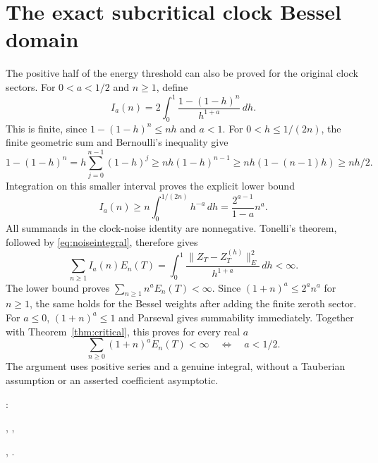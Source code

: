 \documentclass[11pt]{article}
\begin{document}
\section{The exact subcritical clock Bessel domain}
The positive half of the energy threshold can also be proved for the
original clock sectors. For $0<a<1/2$ and $n\geq1$, define
\[
 I_a(n)=2\int_0^1\frac{1-(1-h)^n}{h^{1+a}}\,dh.
\]
This is finite, since $1-(1-h)^n\leq nh$ and $a<1$.
For $0<h\leq1/(2n)$, the finite geometric sum and Bernoulli's inequality
give
\[
 1-(1-h)^n=h\sum_{j=0}^{n-1}(1-h)^j
 \geq nh(1-h)^{n-1}\geq nh(1-(n-1)h)\geq nh/2.
\]
Integration on this smaller interval proves the explicit lower bound
\[
 I_a(n)\geq n\int_0^{1/(2n)}h^{-a}\,dh
       =\frac{2^{a-1}}{1-a}n^a.
\]
All summands in the clock-noise identity are nonnegative. Tonelli's
theorem, followed by \eqref{eq:noiseintegral}, therefore gives
\[
 \sum_{n\geq1}I_a(n)E_n(T)
 =\int_0^1\frac{\|Z_T-Z_T^{(h)}\|_E^2}{h^{1+a}}\,dh<\infty.
\]
The lower bound proves $\sum_{n\geq1}n^aE_n(T)<\infty$.
Since $(1+n)^a\leq2^a n^a$ for $n\geq1$, the same holds for the
Bessel weights after adding the finite zeroth sector. For $a\leq0$,
$(1+n)^a\leq1$ and Parseval gives summability immediately.
Together with Theorem~\ref{thm:critical}, this proves for every real $a$
\begin{equation}\label{eq:sharpbesselsum}
 \sum_{n\geq0}(1+n)^aE_n(T)<\infty
                    \quad\Longleftrightarrow\quad a<1/2.
\end{equation}
The argument uses positive series and a genuine integral, without a
Tauberian assumption or an asserted coefficient asymptotic.
\par\noindent{}:
\par\noindent{}, ,
\par\noindent{}, .
\end{document}
